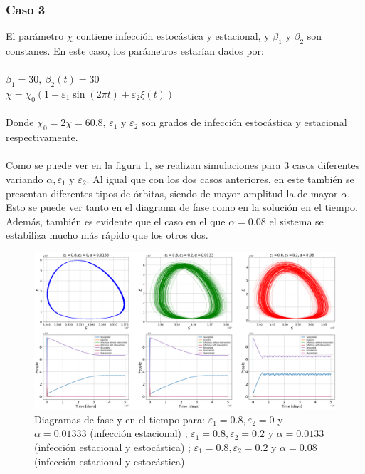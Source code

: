 \documentclass[conference]{IEEEtran}
\begin{document}
\subsubsection{Caso 3}

El parámetro $\chi$ contiene infección estocástica y estacional, y $\beta_1$ y $\beta_2$ son constanes.
En este caso, los parámetros estarían dados por:
\\\\
$\beta_1 = 30, \ \beta_2(t) = 30$
\\
$\chi = \chi_0(1 + \varepsilon_1 \sin(2 \pi t) + \varepsilon_2 \xi(t))$
\\\\
Donde $\chi_0 = 2\chi = 60.8$, $\varepsilon_1$ y $\varepsilon_2$ son grados de infección estocástica y estacional respectivamente.
\\\\
Como se puede ver en la figura \ref{case_3}, se realizan simulaciones para 3 casos diferentes variando $\alpha, 
\varepsilon_1$ y $\varepsilon_2$. Al igual que con los dos casos anteriores, en este también se presentan
diferentes tipos de órbitas, siendo de mayor amplitud la de mayor $\alpha$. Esto se puede ver tanto en el
diagrama de fase como en la solución en el tiempo. Además, también es evidente que el caso en el que $\alpha = 0.08$
el sistema se estabiliza mucho más rápido que los otros dos.
\begin{figure}[h]
    \centering
    \includegraphics[width=18cm]{../Figures/case_3.png}
    \caption{Diagramas de fase y en el tiempo para: $\varepsilon_1 = 0.8, \varepsilon_2 = 0$
    y $\alpha = 0.01333$ (infección estacional) ; $\varepsilon_1 = 0.8, \varepsilon_2 = 0.2$
    y $\alpha = 0.0133$ (infección estacional y estocástica) ; $\varepsilon_1 = 0.8, \varepsilon_2 = 0.2$
    y $\alpha = 0.08$ (infección estacional y estocástica)}
    \label{case_3}
\end{figure}
\end{document}
